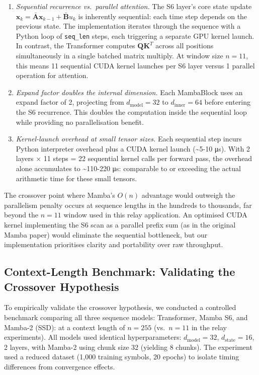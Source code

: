 \begin{enumerate}
\def\labelenumi{\arabic{enumi}.}
\item
  \emph{Sequential recurrence vs.~parallel attention.} The S6 layer's core state update \(\mathbf{x}_k = \bar{\mathbf{A}} \mathbf{x}_{k-1} + \bar{\mathbf{B}} u_k\) is inherently sequential: each time step depends on the previous state. The implementation iterates through the sequence with a Python loop of \texttt{seq\_len} steps, each triggering a separate GPU kernel launch. In contrast, the Transformer computes \(\mathbf{Q}\mathbf{K}^T\) across all positions simultaneously in a single batched matrix multiply. At window size \(n = 11\), this means 11 sequential CUDA kernel launches per S6 layer versus 1 parallel operation for attention.
\item
  \emph{Expand factor doubles the internal dimension.} Each MambaBlock uses an expand factor of 2, projecting from \(d_\text{model} = 32\) to \(d_\text{inner} = 64\) before entering the S6 recurrence. This doubles the computation inside the sequential loop while providing no parallelisation benefit.
\item
  \emph{Kernel-launch overhead at small tensor sizes.} Each sequential step incurs Python interpreter overhead plus a CUDA kernel launch (\textasciitilde5-10 μs). With 2 layers × 11 steps = 22 sequential kernel calls per forward pass, the overhead alone accumulates to \textasciitilde110-220 μs: comparable to or exceeding the actual arithmetic time for these small tensors.
\end{enumerate}

The crossover point where Mamba's \(O(n)\) advantage would outweigh the parallelism penalty occurs at sequence lengths in the hundreds to thousands, far beyond the \(n = 11\) window used in this relay application. An optimised CUDA kernel implementing the S6 scan as a parallel prefix sum (as in the original Mamba paper) would eliminate the sequential bottleneck, but our implementation prioritises clarity and portability over raw throughput.

\subsection{Context-Length Benchmark: Validating the Crossover Hypothesis}\label{sec:context-length-benchmark-validating-the-crossover-hypothesis}

To empirically validate the crossover hypothesis, we conducted a controlled benchmark comparing all three sequence models: Transformer, Mamba S6, and Mamba-2 (SSD): at a context length of \(n = 255\) (vs.~\(n = 11\) in the relay experiments). All models used identical hyperparameters: \(d_{\text{model}} = 32\), \(d_{\text{state}} = 16\), 2 layers, with Mamba-2 using chunk size 32 (yielding 8 chunks). The experiment used a reduced dataset (1,000 training symbols, 20 epochs) to isolate timing differences from convergence effects.

